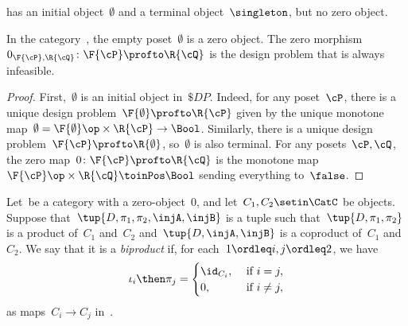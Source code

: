 \begin{example}
    \Pos has an initial object~$\emptyset$ and a terminal object~$\singleton$, but no zero object.
\end{example}

\begin{lemma}
    In the category~\DP, the empty poset~$\emptyset$ is a zero object.
    The zero morphism~$0_{\F{\cP},\R{\cQ}}\colon \F{\cP} \profto \R{\cQ}$ is the design problem that is always infeasible.
\end{lemma}
\begin{proof}
    First,~$\emptyset$ is an initial object in~$\$DP$.
    Indeed, for any poset~$\cP $, there is a unique design problem~$\F{\emptyset} \profto \R{\cP}$ given by the unique monotone map~$\emptyset=\F{\emptyset}\op\times \R{\cP} \to\Bool$.
    Similarly, there is a unique design problem~$\F{\cP} \profto \R{\emptyset}$, so~$\emptyset$ is also terminal.
    For any posets~$\cP ,\cQ$, the zero map~$0 \colon \F{\cP} \profto \R{\cQ}$ is the monotone map~$\F{\cP} \op\times \R{\cQ} \toinPos \Bool$ sending everything to~$\false$.
\end{proof}

\begin{ctdefinition}[Biproduct]
    \label{def:biproduct}
    Let~\CatC be a category with a zero-object~$0$, and let~$C_1,C_2\setin\CatC$ be objects.
    Suppose that~$\tup{D,\pi_1,\pi_2,\injA,\injB}$ is a tuple such that~$\tup{D,\pi_1,\pi_2}$ is a product of~$C_1$ and~$C_2$ and~$\tup{D,\injA,\injB}$ is a coproduct of~$C_1$ and~$C_2$.
    We say that it is a \emph{biproduct} if, for each~$1\ordleq i,j\ordleq 2$, we have
    \begin{equation}
        \iota_i\then \pi_j=
        \begin{cases}
            \id_{C_i}, & \text{ if }i=j,     \\
            0,         & \text{ if }i\neq j,
        \end{cases} \label{eq:biproduct-condition}
    \end{equation}
    as maps~$C_i\to C_j$ in~\CatC.
\end{ctdefinition}

